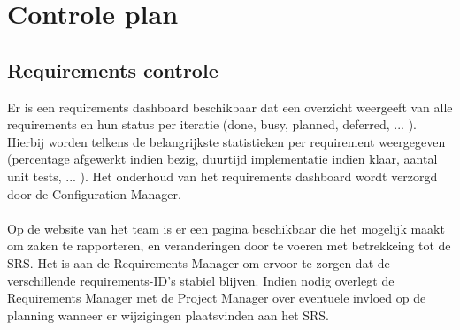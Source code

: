 
\section{Controle plan}
\subsection{Requirements controle} \label{RequirementsControlPlan}
Er is een requirements dashboard beschikbaar dat een overzicht weergeeft van alle requirements en hun status per iteratie (done, busy, planned, deferred, ... ). Hierbij worden telkens de belangrijkste statistieken per requirement weergegeven (percentage afgewerkt indien bezig, duurtijd implementatie indien klaar, aantal unit tests, ... ). Het onderhoud van het requirements dashboard wordt verzorgd door de Configuration Manager.
\\
\\
Op de website van het team \cite{portalWebsite} is er een pagina beschikbaar die het mogelijk maakt om zaken te rapporteren, en veranderingen door te voeren met betrekkeing tot de SRS. Het is aan de Requirements Manager om ervoor te zorgen dat de verschillende requirements-ID's stabiel blijven. Indien nodig overlegt de Requirements Manager met de Project Manager over eventuele invloed op de planning wanneer er wijzigingen plaatsvinden aan het SRS.

